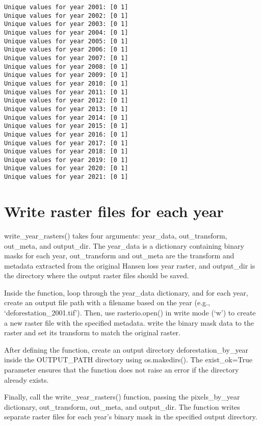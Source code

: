 \documentclass[
  letterpaper,
  DIV=11,
  numbers=noendperiod]{scrartcl}
\begin{document}
\begin{verbatim}
Unique values for year 2001: [0 1]
Unique values for year 2002: [0 1]
Unique values for year 2003: [0 1]
Unique values for year 2004: [0 1]
Unique values for year 2005: [0 1]
Unique values for year 2006: [0 1]
Unique values for year 2007: [0 1]
Unique values for year 2008: [0 1]
Unique values for year 2009: [0 1]
Unique values for year 2010: [0 1]
Unique values for year 2011: [0 1]
Unique values for year 2012: [0 1]
Unique values for year 2013: [0 1]
Unique values for year 2014: [0 1]
Unique values for year 2015: [0 1]
Unique values for year 2016: [0 1]
Unique values for year 2017: [0 1]
Unique values for year 2018: [0 1]
Unique values for year 2019: [0 1]
Unique values for year 2020: [0 1]
Unique values for year 2021: [0 1]
\end{verbatim}

\hypertarget{write-raster-files-for-each-year}{%
\section{Write raster files for each
year}\label{write-raster-files-for-each-year}}

write\_year\_rasters() takes four arguments: year\_data, out\_transform,
out\_meta, and output\_dir. The year\_data is a dictionary containing
binary masks for each year, out\_transform and out\_meta are the
transform and metadata extracted from the original Hansen loss year
raster, and output\_dir is the directory where the output raster files
should be saved.

Inside the function, loop through the year\_data dictionary, and for
each year, create an output file path with a filename based on the year
(e.g., `deforestation\_2001.tif'). Then, use rasterio.open() in write
mode (`w') to create a new raster file with the specified metadata.
write the binary mask data to the raster and set its transform to match
the original raster.

After defining the function, create an output directory
deforestation\_by\_year inside the OUTPUT\_PATH directory using
os.makedirs(). The exist\_ok=True parameter ensures that the function
does not raise an error if the directory already exists.

Finally, call the write\_year\_rasters() function, passing the
pixels\_by\_year dictionary, out\_transform, out\_meta, and output\_dir.
The function writes separate raster files for each year's binary mask in
the specified output directory.
\end{document}
